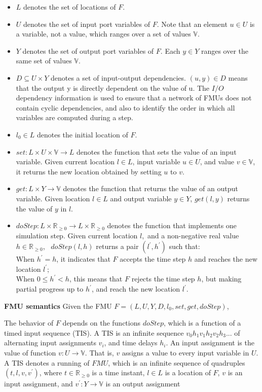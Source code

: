 \begin{itemize}
\item
$L$ denotes the set of locations of $F$. 
\item
$U$ denotes the set of input port variables of $F$. Note that an element $u \in U$ is a variable, not a value, which ranges over a set of values $\mathbb{V}$. 
\item
$Y$ denotes the set of output port variables of $F$. Each $y \in Y$ ranges over the same set of values $\mathbb{V}$.
\item
$D \subseteq U \times Y$ denotes a set of input-output dependencies. $(u,y) \in D $ means that the output y is directly dependent on the value of u. The $I/O$ dependency information is used to ensure that a network of FMUs does not contain cyclic dependencies, and also to identify the order in which all variables are computed during a step.
\item
$l_{0} \in L$ denotes the initial location of $F$.
\item
$set : L \times U \times \mathbb{V} \rightarrow L$ denotes the function that sets the value of an input variable. Given current location $l \in L$, input variable $u \in U$, and value $v \in \mathbb{V}$, it returns the new location obtained by setting $u$ to $v$.
\item
$get : L \times Y \rightarrow \mathbb{V}$ denotes the function that returns the value of an output variable. Given location $l \in L$ and output variable $y \in Y$, $get(l,y)$ returns the value of $y$ in $l$.
\item
$doStep : L \times \mathbb{R}_{\geqslant{0}} \rightarrow L \times \mathbb{R}_{\geqslant{0}}$ denotes the function that implements one simulation step. Given current location $l$,~and a non-negative real value $h \in \mathbb{R}_{\geqslant{0}}$,~    $doStep(l,h)$ returns a pair $(l^{\prime},h^{\prime})$ such that:
\\
When $h^{\prime} = h$, it indicates that $F$ accepts the time step $h$ and reaches the new location $l^{\prime}$;
\\
When $0 \leqslant h^{\prime} < h$, this means that $F$ rejects the time step $h$, but making partial progress up to $h^{\prime}$, and reach the new location $l^{\prime}$.
\end{itemize}
\begin{definition}
\textbf{FMU semantics}
Given the FMU $F=(L,U,Y,D,l_{0},set,get,doStep)$,
\end{definition} 
The behavior of $F$ depends on the functions $doStep$, which is a function of a timed input sequence (TIS). A TIS is an infinite sequence 
$v_{0}h_{1}v_{1}h_{2}v_{2}h_{3}...$
of alternating input assignments $v_{i}$, and time delays $h_{i}$. An input assignment is the value of function $v : U \rightarrow \mathbb{V}$. That is, $v$ assigns a value to every input variable in $U$.
A TIS denotes a running of $FMU$, which is an infinite sequence of quadruples $(t,l,v,v^{\prime})$, where $t \in \mathbb{R}_{\geqslant{0}}$ is a time instant, $l \in L$ is a location of $F$, $v$ is an input assignment, and $v^{\prime} : Y \rightarrow \mathbb{V}$ is an output assignment
 

